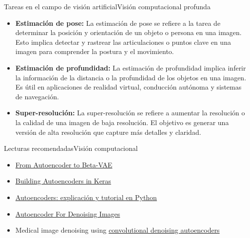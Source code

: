 \documentclass[10pt,border=3pt,tikz]{beamer}
\begin{document}
    \begin{frame}{Tareas en el campo de visión artificial}{Visión computacional profunda}
        \begin{itemize}
            \item \textbf{Estimación de pose:} La estimación de pose se refiere a la tarea de determinar la posición y orientación de un objeto o persona en una imagen. Esto implica detectar y rastrear las articulaciones o puntos clave en una imagen para comprender la postura y el movimiento.
            \item \textbf{Estimación de profundidad:} La estimación de profundidad implica inferir la información de la distancia o la profundidad de los objetos en una imagen. Es útil en aplicaciones de realidad virtual, conducción autónoma y sistemas de navegación.
            \item \textbf{Super-resolución:} La super-resolución se refiere a aumentar la resolución o la calidad de una imagen de baja resolución. El objetivo es generar una versión de alta resolución que capture más detalles y claridad.
        \end{itemize}
    \end{frame}
    
    \begin{frame}{Lecturas recomendadas}{Visión computacional}
        \begin{itemize}
            \item \colorbox{blue!10}{\href{https://lilianweng.github.io/posts/2018-08-12-vae/}{From Autoencoder to Beta-VAE}}
            \item \colorbox{blue!10}{\href{https://blog.keras.io/building-autoencoders-in-keras.html}{Building Autoencoders in Keras}}
            \item \colorbox{blue!10}{\href{https://www.codificandobits.com/blog/autoencoders-explicacion-y-tutorial-python/}{Autoencoders: explicación y tutorial en Python}}
            \item \colorbox{blue!10}{\href{https://towardsdatascience.com/autoencoder-for-denoising-images-7d63a0831bfd}{Autoencoder For Denoising Images}}
            \item Medical image denoising using \colorbox{blue!10}{\href{https://arxiv.org/pdf/1608.04667}{convolutional denoising autoencoders}}
            
        \end{itemize}
    \end{frame}
\end{document}
